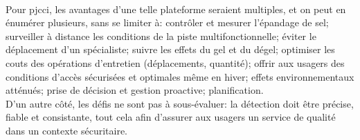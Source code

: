 \vspace{0.5\baselineskip}
\\
\noindent Pour \acrshort{pjcci}, les avantages d'une telle plateforme seraient multiples, et on peut en énumérer plusieurs, sans se limiter à: contrôler et mesurer l'épandage de sel; surveiller à distance les conditions de la piste multifonctionnelle; éviter le déplacement d'un spécialiste; suivre les effets du gel et du dégel; optimiser les couts des opérations d'entretien (déplacements, quantité); offrir aux usagers des conditions d'accès sécurisées et optimales même en hiver; effets environnementaux atténués; prise de décision et gestion proactive; planification.
\vspace{0.5\baselineskip}
\\
\noindent D'un autre côté, les défis ne sont pas à sous-évaluer: la détection doit être précise, fiable et consistante, tout cela afin d'assurer aux usagers un service de qualité dans un contexte sécuritaire.